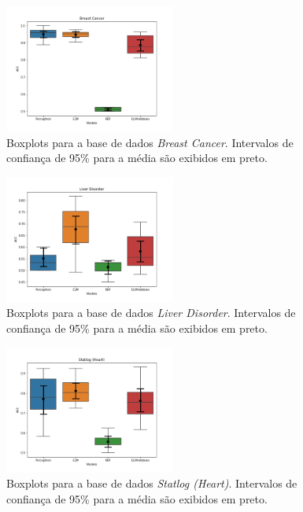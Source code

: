 \documentclass[conference]{IEEEtran}
\begin{document}
	\begin{figure}[thpbh]
		\centering
		\includegraphics[width=0.5\textwidth]{figures/Breast Cancer_scores.png}
		\caption{Boxplots para a base de dados \textit{Breast Cancer}. Intervalos de confiança de 95\% para a média são exibidos em preto.}
		\label{fig:box-Breast Cancer}
	\end{figure}
	
		\begin{figure}[thpbh]
		\centering
		\includegraphics[width=0.5\textwidth]{figures/Liver Disorder_scores.png}
		\caption{Boxplots para a base de dados \textit{Liver Disorder}. Intervalos de confiança de 95\% para a média são exibidos em preto.}
		\label{fig:box-Liver-Disorder}
	\end{figure}	
	
	
	\begin{figure}[thpbh]
		\centering
		\includegraphics[width=0.5\textwidth]{figures/Statlog (Heart)_scores.png}
		\caption{Boxplots para a base de dados \textit{Statlog (Heart)}. Intervalos de confiança de 95\% para a média são exibidos em preto.}
		\label{fig:box-statlog-heart}
	\end{figure}
	
\end{document}
